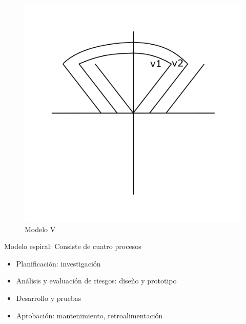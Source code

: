 \begin{enumerate}
    \begin{figure}[h!]
        \centering
            \includegraphics[scale=0.25]{Proyecto Integrador Figuras/06 Modelo v.png}
            \caption{Modelo V}
    \end{figure}
    
    Modelo espiral: Consiste de cuatro procesos
    
    \begin{itemize}
        \item Planificación: investigación 
        \item Análisis y evaluación de riesgos: diseño y prototipo
        \item Desarrollo y pruebas
        \item Aprobación: mantenimiento, retroalimentación 
    \end{itemize}


\end{enumerate}
